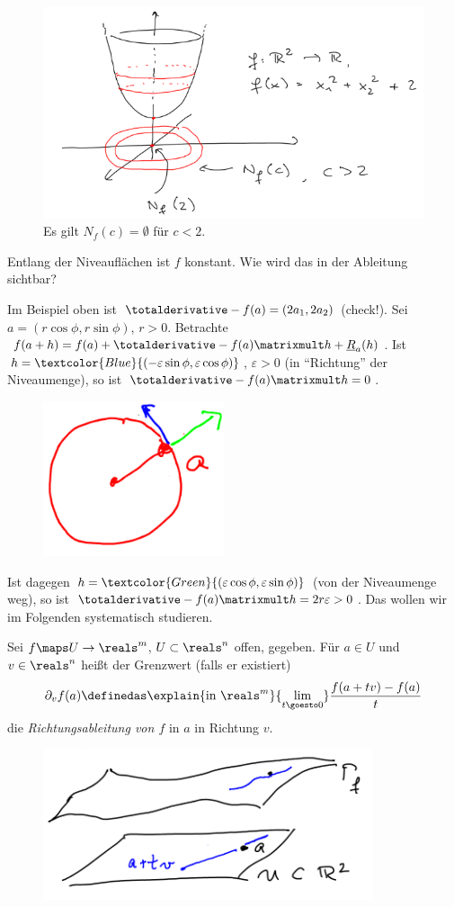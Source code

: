 \begin{beispiel*}
    \begin{figure}[H]
        \centering
        \includegraphics[width=0.5\linewidth]{figures/niveau_menge_beispiel}
        \caption*{Es gilt \( N_f(c)=\emptyset \) für \( c<2 \).}
        \label{fig:niveau_menge_beispiel}
    \end{figure}
    Entlang der Niveauflächen ist \( f \) konstant. Wie wird das in der Ableitung sichtbar?

    Im Beispiel oben ist \( \totalderivative-{f}(a)=(2a_1,2a_2) \) (check!). Sei \( a=(r\cos \phi, r\sin \phi) \), \( r>0 \). Betrachte \( f(a+h)=f(a)+\totalderivative-{f}(a)\matrixmult h+\underline{R}_a(h) \). Ist \( h=\textcolor{Blue}{(-\varepsilon \sin \phi, \varepsilon \cos \phi)} \), \( \varepsilon>0 \) (in \enquote{Richtung} der Niveaumenge), so ist \( \totalderivative-{f}(a)\matrixmult h=0 \).
    \begin{figure}[H]
        \centering
        \includegraphics[width=0.2\linewidth]{figures/in_richtung_und_orthogonal_der_niveaumenge}
        \label{fig:in_richtung_und_orthogonal_der_niveaumenge}
    \end{figure}
    Ist dagegen \( h=\textcolor{Green}{(\varepsilon \cos \phi, \varepsilon \sin \phi)} \) (von der Niveaumenge weg), so ist \( \totalderivative-{f}(a)\matrixmult h=2r\varepsilon>0 \). Das wollen wir im Folgenden systematisch studieren.
\end{beispiel*}
\begin{definition*}
    Sei \( f\maps U\to \reals^m \), \( U\subset \reals^n \) offen, gegeben. Für \( a\in U \) und \( v\in \reals^n \) heißt der Grenzwert (falls er existiert)
    \begin{align*}
        \partial_v f(a)\definedas \explain{\text{in \( \reals^m \)}}{\lim_{t \goesto 0}}\frac{f(a+tv)-f(a)}{t}
    \end{align*}
    die \emph{Richtungsableitung von \( f \)} in \( a \) in Richtung \( v \).
    \begin{figure}[H]
        \centering
        \includegraphics[width=0.5\linewidth]{figures/richtungsableitung}
        \label{fig:richtungsableitung}
    \end{figure}
\end{definition*}
